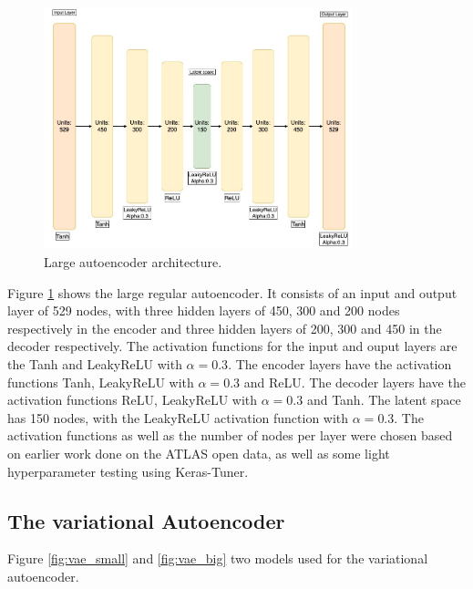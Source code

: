 \begin{figure}[H]
    \centering
    \includegraphics[width=0.8\textwidth]{Figures/nnarchitect/ae_big.jpeg}
    \caption[AE | Large network architecture]{Large autoencoder architecture.}
    \label{fig:ae_big}
\end{figure}

Figure \ref{fig:ae_big} shows the large regular autoencoder. It consists of an input and output layer of 529 nodes, with three 
hidden layers of 450, 300 and 200 nodes respectively in the encoder and three hidden layers of 200, 300 and 450 in the decoder respectively. 
The activation functions for the input and ouput layers are the Tanh and LeakyReLU with $\alpha=0.3$. The encoder layers 
have the activation functions Tanh, LeakyReLU with $\alpha=0.3$ and ReLU. The decoder layers have the activation functions ReLU, 
LeakyReLU with $\alpha=0.3$ and Tanh. The latent space has 150 nodes,
with the LeakyReLU activation function with $\alpha=0.3$. The activation functions as well as the number of nodes per layer were chosen 
based on earlier work done 
on the ATLAS open data\cite{fys5555}, as well as some light hyperparameter testing using Keras-Tuner\cite{omalley2019kerastuner}.
\subsection*{The variational Autoencoder}
Figure \ref{fig:vae_small} and \ref{fig:vae_big} two models used for the variational autoencoder. 

